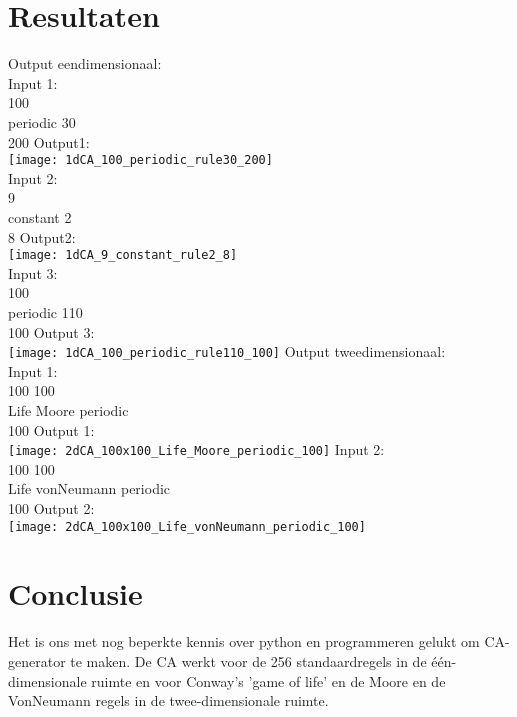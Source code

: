 \documentclass[12pt,a4paper]{article}
\begin{document}
\section*{Resultaten}
Output eendimensionaal: \\
Input 1: \\
100 \\
periodic 30 \\
200
\newline Output1: \\
\texttt{[image: 1dCA\_100\_periodic\_rule30\_200]} \\
\newpage
Input 2: \\
9 \\
constant 2 \\
8
\newline Output2: \\
\texttt{[image: 1dCA\_9\_constant\_rule2\_8]} \\
Input 3: \\
100 \\
periodic 110 \\
100
\newline Output 3: \\
\texttt{[image: 1dCA\_100\_periodic\_rule110\_100]}
\newpage
Output tweedimensionaal: \\
Input 1: \\
100 100 \\
Life Moore periodic \\
100
\newline Output 1: \\
\texttt{[image: 2dCA\_100x100\_Life\_Moore\_periodic\_100]}
\newpage
Input 2: \\
100 100 \\
Life vonNeumann periodic \\
100
\newline Output 2: \\
\texttt{[image: 2dCA\_100x100\_Life\_vonNeumann\_periodic\_100]}



\section*{Conclusie}
Het is ons met nog beperkte kennis over python en programmeren gelukt om CA-generator te maken. De CA werkt voor de 256 standaardregels in de één-dimensionale ruimte en voor Conway's 'game of life' en de Moore en de VonNeumann regels in de twee-dimensionale ruimte.
\end{document}
